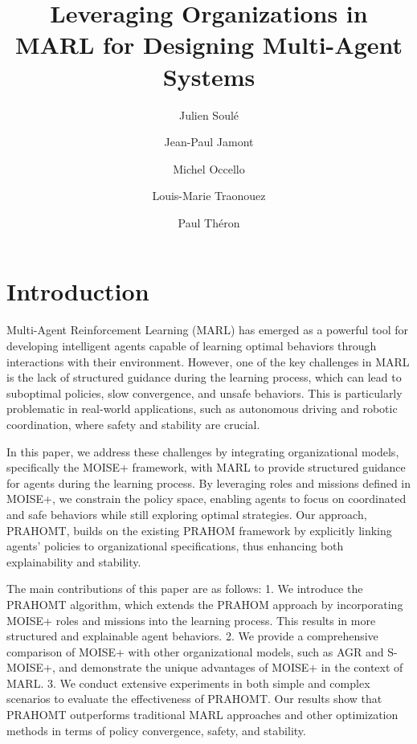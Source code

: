 \documentclass[sigconf,anonymous]{aamas}
\title[AAMAS-2025 CybMASDE]{Leveraging Organizations in MARL for Designing Multi-Agent Systems}
\author{Julien Soulé}
\affiliation{
  \institution{Univ. Grenoble Alpes}
  \city{Valence}
  \country{France}}
\author{Jean-Paul Jamont}
\affiliation{
  \institution{Univ. Grenoble Alpes}
  \city{Valence}
  \country{France}}
\author{Michel Occello}
\affiliation{
  \institution{Univ. Grenoble Alpes}
  \city{Valence}
  \country{France}}
\author{Louis-Marie Traonouez}
\affiliation{
  \institution{Thales Land and Air Systems, BU IAS}
  \city{Rennes}
  \country{France}}
\author{Paul Théron}
\affiliation{
  \institution{AICA IWG}
  \city{La Guillermie}
  \country{France}}
\begin{document}

\pagestyle{fancy}
\fancyhead{}


\maketitle




\section{Introduction}
Multi-Agent Reinforcement Learning (MARL) has emerged as a powerful tool for developing intelligent agents capable of learning optimal behaviors through interactions with their environment. However, one of the key challenges in MARL is the lack of structured guidance during the learning process, which can lead to suboptimal policies, slow convergence, and unsafe behaviors. This is particularly problematic in real-world applications, such as autonomous driving and robotic coordination, where safety and stability are crucial.

In this paper, we address these challenges by integrating organizational models, specifically the MOISE+ framework, with MARL to provide structured guidance for agents during the learning process. By leveraging roles and missions defined in MOISE+, we constrain the policy space, enabling agents to focus on coordinated and safe behaviors while still exploring optimal strategies. Our approach, PRAHOMT, builds on the existing PRAHOM framework by explicitly linking agents' policies to organizational specifications, thus enhancing both explainability and stability.

The main contributions of this paper are as follows:
1. We introduce the PRAHOMT algorithm, which extends the PRAHOM approach by incorporating MOISE+ roles and missions into the learning process. This results in more structured and explainable agent behaviors.
2. We provide a comprehensive comparison of MOISE+ with other organizational models, such as AGR and S-MOISE+, and demonstrate the unique advantages of MOISE+ in the context of MARL.
3. We conduct extensive experiments in both simple and complex scenarios to evaluate the effectiveness of PRAHOMT. Our results show that PRAHOMT outperforms traditional MARL approaches and other optimization methods in terms of policy convergence, safety, and stability.
\end{document}
